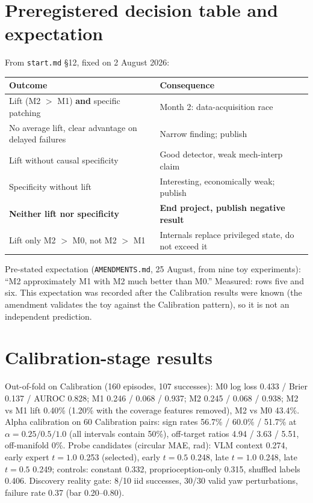 \documentclass[11pt,a4paper]{article}
\newcommand{\Mz}{M0}\newcommand{\Mo}{M1}\newcommand{\Mt}{M2}
\begin{document}
\appendix
\section{Preregistered decision table and expectation}
\label{app:prereg}
From \texttt{start.md} \S12, fixed on 2 August 2026:
\begin{center}\small
\begin{tabular}{p{}p{}}
\toprule
Outcome & Consequence \\
\midrule
Lift (\Mt{} $>$ \Mo{}) \textbf{and} specific patching & Month 2: data-acquisition race \\
No average lift, clear advantage on delayed failures & Narrow finding; publish \\
Lift without causal specificity & Good detector, weak mech-interp claim \\
Specificity without lift & Interesting, economically weak; publish \\
\textbf{Neither lift nor specificity} & \textbf{End project, publish negative result} \\
Lift only \Mt{} $>$ \Mz{}, not \Mt{} $>$ \Mo{} & Internals replace privileged state, do not exceed it \\
\bottomrule
\end{tabular}
\end{center}
Pre-stated expectation (\texttt{AMENDMENTS.md}, 25 August, from nine toy experiments): ``\Mt{} approximately \Mo{} with \Mt{} much better than \Mz{}.'' Measured: rows five and six. This expectation was recorded after the Calibration results were known (the amendment validates the toy against the Calibration pattern), so it is not an independent prediction.

\section{Calibration-stage results}
\label{app:calib}
Out-of-fold on Calibration (160 episodes, 107 successes): \Mz{} log loss 0.433 / Brier 0.137 / AUROC 0.828; \Mo{} 0.246 / 0.068 / 0.937; \Mt{} 0.245 / 0.068 / 0.938; \Mt{} vs \Mo{} lift 0.40\% (1.20\% with the coverage features removed), \Mt{} vs \Mz{} 43.4\%. Alpha calibration on 60 Calibration pairs: sign rates 56.7\% / 60.0\% / 51.7\% at $\alpha = 0.25/0.5/1.0$ (all intervals contain 50\%), off-target ratios 4.94 / 3.63 / 5.51, off-manifold 0\%. Probe candidates (circular MAE, rad): VLM context 0.274, early expert $t{=}1.0$ 0.253 (selected), early $t{=}0.5$ 0.248, late $t{=}1.0$ 0.248, late $t{=}0.5$ 0.249; controls: constant 0.332, proprioception-only 0.315, shuffled labels 0.406. Discovery reality gate: 8/10 iid successes, 30/30 valid yaw perturbations, failure rate 0.37 (bar 0.20--0.80).
\end{document}
